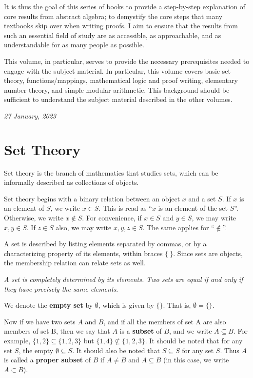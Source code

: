 It is thus the goal of this series of books to provide a step-by-step explanation of core results from abstract algebra; to demystify the core steps that many textbooks skip over when writing proofs. I aim to ensure that the results from such an essential field of study are as accessible, as approachable, and as understandable for as many people as possible.

This volume, in particular, serves to provide the necessary prerequisites needed to engage with the subject material. In particular, this volume covers basic set theory, functions/mappings, mathematical logic and proof writing, elementary number theory, and simple modular arithmetic. This background should be sufficient to understand the subject material described in the other volumes.

\hfill{\textit{27 January, 2023}}
\newpage

\mainmatter  %
\chapter{Set Theory}
Set theory is the branch of mathematics that studies sets, which can be informally described as collections of objects.

Set theory begins with a binary relation between an object $x$ and a set $S$. If $x$ is an element of $S$, we write $x \in S$. This is read as ``$x$ is an element of the set $S$''. Otherwise, we write $x \notin S$. For convenience, if $x \in S$ and $y \in S$, we may write $x, y \in S$. If $z \in S$ also, we may write $x, y, z \in S$. The same applies for ``$\notin$''.

A set is described by listing elements separated by commas, or by a characterizing property of its elements, within braces $\{ \ \}$. Since sets are objects, the membership relation can relate sets as well.

\textit{A set is completely determined by its elements. Two sets are equal if and only if they have precisely the same elements}.

We denote the \textbf{empty set} by $\emptyset$, which is given by $\{\}$. That is, $\emptyset = \{\}$.

Now if we have two sets $A$ and $B$, and if all the members of set A are also members of set B, then we say that $A$ is a \textbf{subset} of $B$, and we write $A \subseteq B$. For example, $\{1, 2\} \subseteq \{1, 2, 3\}$ but $\{1, 4\} \not\subseteq \{1, 2, 3\}$. It should be noted that for any set $S$, the empty $\emptyset \subseteq S$. It should also be noted that $S \subseteq S$ for any set $S$. Thus $A$ is called a \textbf{proper subset} of $B$ if $A \neq B$ and $A \subseteq B$ (in this case, we write $A \subset B$).

